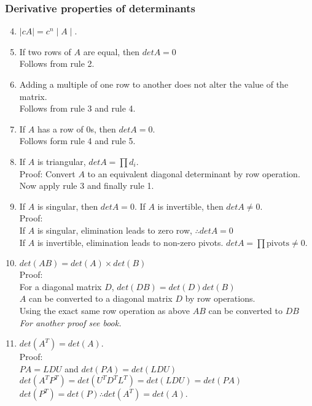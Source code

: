 \subsubsection{Derivative properties of determinants}
\begin{enumerate}
	\setcounter{enumi}{3}
	\item $\mid cA \mid = c^n \mid A \mid$.
	\item If two rows of $A$ are equal, then $det A = 0$\\
	Follows from rule 2.
	\item Adding a multiple of one row to another does not alter the value of the matrix.\\
	Follows from rule 3 and rule 4.
	\item If $A$ has a row of $0$s, then $det A = 0$.\\
	Follows form rule 4 and rule 5.
	\item If $A$ is triangular, $det A = \prod d_i$.\\
	Proof: Convert $A$ to an equivalent diagonal determinant by row operation. Now apply rule 3 and finally rule 1.
	\item If $A$ is singular, then $det A = 0$. If $A$ is invertible, then $detA \neq 0$.\\
	Proof:\\
	If $A$ is singular, elimination leads to zero row, $\therefore detA= 0$\\
	If $A$ is invertible, elimination leads to non-zero pivots. $detA = \prod \text{pivots} \neq 0$.
	\item $det(AB) = det(A)\times det(B)$\\
	Proof:\\
	For a diagonal matrix $D$, $det(DB) = det(D)det(B)$\\
	$A$ can be converted to a diagonal matrix $D$ by row operations.\\
	Using the exact same row operation as above $AB$ can be converted to $DB$\\
	\textit{For another proof see book.}
	\item $det(A^T) = det(A)$.\\
	Proof:\\ 
	$PA = LDU$ and $det(PA) = det(LDU)$\\
	$det(A^TP^T) = det(U^TD^TL^T) = det (LDU) = det(PA)$\\
	$det(P^T) = det(P) \therefore det(A^T) = det(A)$.

\end{enumerate}


